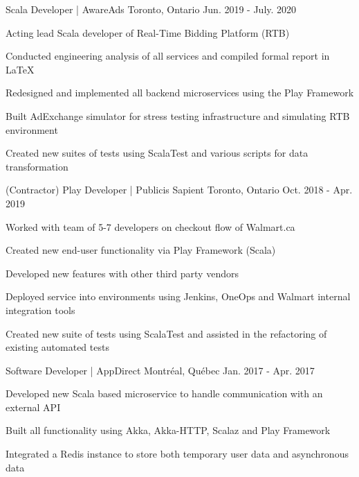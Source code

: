 \begin{cventries}
    {Scala Developer | AwareAds}
    {Toronto, Ontario}
    {Jun. 2019 - July. 2020}
    {
      \begin{cvitems}
        \item {Acting lead Scala developer of Real-Time Bidding Platform (RTB)}
        \item {Conducted engineering analysis of all services and compiled formal report in \LaTeX}
        \item {Redesigned and implemented all backend microservices using the Play Framework}
        \item {Built AdExchange simulator for stress testing infrastructure and simulating RTB environment}
        \item {Created new suites of tests using ScalaTest and various scripts for data transformation}
      \end{cvitems}
    }
    {(Contractor) Play Developer | Publicis Sapient}
    {Toronto, Ontario}
    {Oct. 2018 - Apr. 2019}
    {
      \begin{cvitems}
        \item {Worked with team of 5-7 developers on checkout flow of Walmart.ca}
        \item {Created new end-user functionality via Play Framework (Scala) }
        \item {Developed new features with other third party vendors}
        \item {Deployed service into environments using Jenkins, OneOps and Walmart internal integration tools}
        \item {Created new suite of tests using ScalaTest and assisted in the refactoring of existing automated tests}
      \end{cvitems}
    }
    {\vspace{-3mm}Software Developer | AppDirect}
    {Montréal, Québec}
    {Jan. 2017 - Apr. 2017 }
    {
      \begin{cvitems}
        \item {Developed new Scala based microservice to handle communication with an external API}
        \item {Built all functionality using Akka, Akka-HTTP, Scalaz and Play Framework}
        \item {Integrated a Redis instance to store both temporary user data and asynchronous data}

\end{cvitems}}
\end{cventries}
